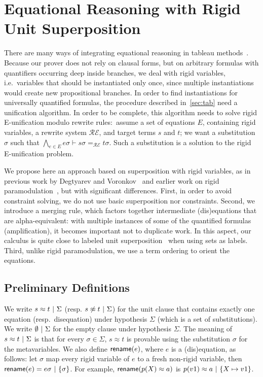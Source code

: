 
\section{Equational Reasoning with Rigid Unit Superposition}
\label{sec:super}

There are many ways of integrating equational reasoning in tableau
methods~\cite{DB75,LS02,BR15,DV96}. Because our prover does not rely on clausal
forms, but on arbitrary formulas with quantifiers occurring deep inside
branches, we deal with rigid variables, i.e.~variables that should be
instantiated only once, since multiple instantiations would create new
propositional branches.  In order to find instantiations for universally
quantified formulas, the procedure described in~\ref{sec:tab} need a unification
algorithm. In order to be complete, this algorithm needs to solve rigid
E-unification modulo rewrite rules:~assume a set of equations $E$, containing
rigid variables, a rewrite system $\mathcal{RE}$, and target terms $s$ and $t$;
we want a substitution $\sigma$ such that $\bigwedge_{e \in E} e\sigma \vdash
s\sigma =_\mathcal{RE} t\sigma$. Such a substitution is a solution to the rigid
E-unification problem.

We propose here an approach based on superposition with rigid variables, as in
previous work by Degtyarev and Voronkov~\cite{DV96} and earlier work on rigid
paramodulation~\cite{DAP00}, but with significant differences. First, in order
to avoid constraint solving, we do not use basic superposition nor
constraints. Second, we introduce a merging rule, which factors together
intermediate (dis)equations that are alpha-equivalent: with multiple instances
of some of the quantified formulas (amplification), it becomes important not to
duplicate work. In this aspect, our calculus is quite close to labeled unit
superposition~\cite{KS10} when using sets as labels. Third, unlike rigid
paramodulation, we use a term ordering to orient the equations.

\subsection{Preliminary Definitions}

We write $  s \approx t  ~|~  \Sigma$ (resp.  $
  s \not\approx t  ~|~  \Sigma$) for the unit clause that contains exactly one
equation (resp.~disequation) under hypothesis $\Sigma$ (which is a set of
substitutions). We write $\emptyset ~|~ \Sigma$ for the empty
clause under hypothesis $\Sigma$.  The meaning of $s \approx
  t ~|~  \Sigma$ is that for every $\sigma \in \Sigma$, $s \approx t$ is provable
using the substitution $\sigma$ for the metavariables.  We also define
$\textsf{rename}(e)$, where $e$ is a (dis)equation, as follows: let $\sigma$ map
every rigid variable of $e$ to a fresh non-rigid variable, then $\textsf{rename}(e)
=  e\sigma  ~|~  \{ \sigma \} $. For example,
$\textsf{rename}(p(X)\approx a)$ is
$ p(v1)\approx a ~|~  \{ X\mapsto v1\} $.

